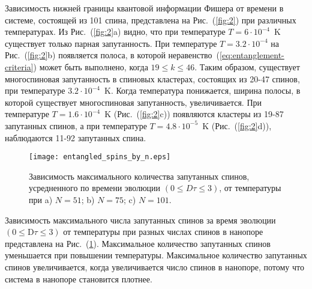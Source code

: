 Зависимость нижней границы квантовой информации Фишера от времени в системе, состоящей из 101 спина, представлена на Рис.~(\ref{fig:2}) при различных температурах.
Из Рис.~(\ref{fig:2}a) видно, что при температуре $T=6\cdot10^{-4}$~K существует только парная запутанность.
При температуре $T=3.2\cdot10^{-4}$ на Рис.~(\ref{fig:2}b) появляется полоса, в которой неравенство~(\ref{eq:entanglement-criteria}) может быть выполнено, когда $19 \leq k \leq 46$.
Таким образом, существует многоспиновая запутанность в спиновых кластерах, состоящих из 20-47 спинов, при температуре $3.2\cdot10^{-4}$~K.
Когда температура понижается, ширина полосы, в которой существует многоспиновая запутанность, увеличивается.
При температуре $T=1.6\cdot10^{-4}$~K (Рис.~(\ref{fig:2}c)) появляются кластеры из 19-87 запутанных спинов, а при температуре $T=4.8\cdot10^{-5}$~K (Рис.~(\ref{fig:2}d)), наблюдаются 11-92 запутанных спина.

\begin{figure}
 	\texttt{[image: entangled\_spins\_by\_n.eps]}
	\caption{
	  Зависимость максимального количества запутанных спинов,
	  усредненного по времени эволюции $(0 \leq D\tau \leq 3)$,
	  от температуры при  a) $N=51$; b) $N=75$; c) $N=101$.
	}
	\label{fig:3}
\end{figure}

Зависимость максимального числа запутанных спинов за время эволюции $({0}\leq \mathrm{D}\tau\leq{3})$ от температуры при разных числах спинов в нанопоре представлена на Рис.~(\ref{fig:3}).
Максимальное количество запутанных спинов уменьшается при повышении температуры.
Максимальное количество запутанных спинов увеличивается, когда увеличивается число спинов в нанопоре, потому что система в нанопоре становится плотнее.

